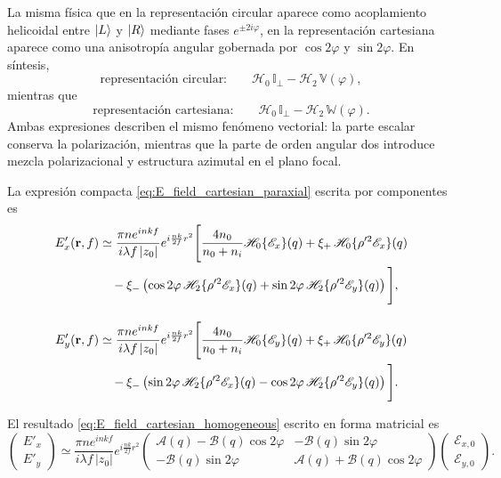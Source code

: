 La misma física que en la representación circular aparece como acoplamiento
helicoidal entre $\ket L$ y $\ket R$ mediante fases $e^{\pm2i\varphi}$, en la
representación cartesiana aparece como una anisotropía angular gobernada por
$\cos2\varphi$ y $\sin2\varphi$. En síntesis,
\begin{equation}
\text{representación circular:}
\qquad
\mathscr H_0\,\mathbb I_\perp
-
\mathscr H_2\,\mathbb V(\varphi),
\end{equation}
mientras que
\begin{equation}
\text{representación cartesiana:}
\qquad
\mathscr H_0\,\mathbb I_\perp
-
\mathscr H_2\,\mathbb W(\varphi).
\end{equation}
Ambas expresiones describen el mismo fenómeno vectorial: la parte escalar
conserva la polarización, mientras que la parte de orden angular dos introduce
mezcla polarizacional y estructura azimutal en el plano focal.

La expresión compacta \eqref{eq:E_field_cartesian_paraxial} escrita por componentes es
\begin{equation}
\begin{aligned}
E'_x(\vb r,f)
&\simeq
\frac{\pi n e^{inkf}}{i\lambda f\,|z_0|}
e^{i\frac{nk}{2f}r^2}
\Bigg[
\frac{4n_0}{n_0+n_i}
\mathscr H_0\{\mathscr E_x\}(q)
+
\xi_+\,
\mathscr H_0\{\rho'^2\mathscr E_x\}(q)
\\
&\quad
-
\xi_-
\left(
\cos2\varphi\,
\mathscr H_2\{\rho'^2\mathscr E_x\}(q)
+
\sin2\varphi\,
\mathscr H_2\{\rho'^2\mathscr E_y\}(q)
\right)
\Bigg],
\\[1em]
E'_y(\vb r,f)
&\simeq
\frac{\pi n e^{inkf}}{i\lambda f\,|z_0|}
e^{i\frac{nk}{2f}r^2}
\Bigg[
\frac{4n_0}{n_0+n_i}
\mathscr H_0\{\mathscr E_y\}(q)
+
\xi_+\,
\mathscr H_0\{\rho'^2\mathscr E_y\}(q)
\\
&\quad
-
\xi_-
\left(
\sin2\varphi\,
\mathscr H_2\{\rho'^2\mathscr E_x\}(q)
-
\cos2\varphi\,
\mathscr H_2\{\rho'^2\mathscr E_y\}(q)
\right)
\Bigg].
\end{aligned}
\label{eq:Ex_Ey_cartesian_paraxial}
\end{equation}

El resultado \eqref{eq:E_field_cartesian_homogeneous} escrito en forma matricial es
\begin{equation}
\begin{pmatrix}
E'_x\\
E'_y
\end{pmatrix}
\simeq
\frac{\pi n e^{inkf}}{i\lambda f\,|z_0|}
e^{i\frac{nk}{2f}r^2}
\begin{pmatrix}
\mathcal A(q)-\mathcal B(q)\cos2\varphi
&
-\mathcal B(q)\sin2\varphi
\\
-\mathcal B(q)\sin2\varphi
&
\mathcal A(q)+\mathcal B(q)\cos2\varphi
\end{pmatrix}
\begin{pmatrix}
\mathscr E_{x,0}\\
\mathscr E_{y,0}
\end{pmatrix}.
\label{eq:E_field_cartesian_homogeneous_matrix}
\end{equation}

